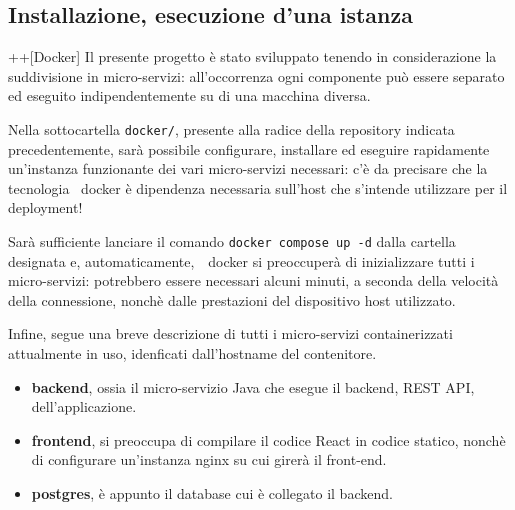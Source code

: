 \newpage
\subsection*{Installazione, esecuzione d'una istanza}+\Brandsdocker+[Docker]
Il presente progetto è stato sviluppato tenendo in considerazione la suddivisione
in micro-servizi: all'occorrenza ogni componente può essere separato ed eseguito indipendentemente
su di una macchina diversa.

Nella sottocartella \texttt{\color{seagreen}docker/}, presente alla radice della repository
indicata precedentemente, sarà possibile configurare, installare ed eseguire
rapidamente un'instanza funzionante dei vari micro-servizi necessari: c'è da precisare
che la tecnologia \Brandsdocker\ docker è dipendenza necessaria sull'host che s'intende
utilizzare per il deployment!

Sarà sufficiente lanciare il comando \texttt{\color{seagreen}docker compose up -d} dalla cartella
designata e, automaticamente,\ \Brandsdocker\ docker si preoccuperà di inizializzare tutti
i micro-servizi: potrebbero essere necessari alcuni minuti, a seconda della velocità 
della connessione, nonchè dalle prestazioni del dispositivo host utilizzato.

Infine, segue una breve descrizione di tutti i micro-servizi containerizzati attualmente in uso,
idenficati dall'hostname del contenitore.
\begin{itemize}
	\item \textbf{backend}, ossia il micro-servizio Java che esegue il backend, REST API, dell'applicazione.
	\item \textbf{frontend}, si preoccupa di compilare il codice React in codice statico, nonchè
	di configurare un'instanza nginx su cui girerà il front-end.
	\item \textbf{postgres}, è appunto il database cui è collegato il backend.
\end{itemize}
